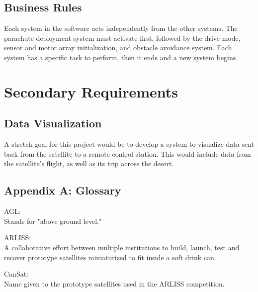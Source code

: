\documentclass[10pt,onecolumn,draftclsnofoot,document]{IEEEtran}
\newenvironment{hangingpar}[1]
{\begin{list}
          {}{
		\setlength{\itemindent}{-#1}
           	\setlength{\leftmargin}{#1}
           	\setlength{\itemsep}{0pt}
           	\setlength{\parsep}{\parskip}
           	\setlength{\topsep}{\parskip}
           }
    	\setlength{\parindent}{-#1}%
    	\item[]
}
{\end{list}}
\begin{document}
\subsection{Business Rules}
Each system in the software acts independently from the other systems. The parachute deployment system must activate first, followed by the drive mode, sensor and motor array initialization, and obstacle avoidance system. Each system has a specific task to perform, then it ends and a new system begins.

\section{Secondary Requirements}
\subsection{Data Visualization}
A stretch goal for this project would be to develop a system to visualize data sent back from the satellite to a remote control station. This would include data from the satellite's flight, as well as its trip across the desert.



\subsection{Appendix A: Glossary}

\begin{hangingpar}{3em}{}
\vspace{.7cm}
AGL: \\ Stands for "above ground level."\\
\par
ARLISS:\\ A collaborative effort between multiple institutions to build, launch, test and recover prototype satellites miniaturized to fit inside a soft drink can.\\
\par
CanSat:\\ Name given to the prototype satellites used in the ARLISS competition.\\


\end{hangingpar}
\clearpage

\end{document}
